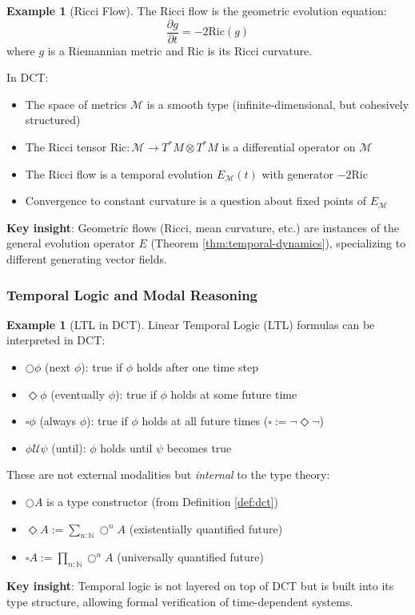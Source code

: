 \documentclass[11pt]{article}
\theoremstyle{definition}
\newtheorem{example}[theorem]{Example}
\begin{document}
\begin{example}[Ricci Flow]
The Ricci flow is the geometric evolution equation:
\[
\frac{\partial g}{\partial t} = -2 \text{Ric}(g)
\]
where $g$ is a Riemannian metric and $\text{Ric}$ is its Ricci curvature.

In DCT:
\begin{itemize}
\item The space of metrics $\mathcal{M}$ is a smooth type (infinite-dimensional, but cohesively structured)
\item The Ricci tensor $\text{Ric} : \mathcal{M} \to T^*M \otimes T^*M$ is a differential operator on $\mathcal{M}$
\item The Ricci flow is a temporal evolution $E_{\mathcal{M}}(t)$ with generator $-2\text{Ric}$
\item Convergence to constant curvature is a question about fixed points of $E_{\mathcal{M}}$
\end{itemize}

\textbf{Key insight}: Geometric flows (Ricci, mean curvature, etc.) are instances of the general evolution operator $E$ (Theorem \ref{thm:temporal-dynamics}), specializing to different generating vector fields.
\end{example}

\subsubsection{Temporal Logic and Modal Reasoning}

\begin{example}[LTL in DCT]
Linear Temporal Logic (LTL) formulas can be interpreted in DCT:

\begin{itemize}
\item $\bigcirc \phi$ (next $\phi$): true if $\phi$ holds after one time step
\item $\Diamond \phi$ (eventually $\phi$): true if $\phi$ holds at some future time
\item $\square \phi$ (always $\phi$): true if $\phi$ holds at all future times ($\square := \neg \Diamond \neg$)
\item $\phi \mathcal{U} \psi$ (until): $\phi$ holds until $\psi$ becomes true
\end{itemize}

These are not external modalities but \emph{internal} to the type theory:
\begin{itemize}
\item $\bigcirc A$ is a type constructor (from Definition \ref{def:dct})
\item $\Diamond A := \sum_{n:\mathbb{N}} \bigcirc^n A$ (existentially quantified future)
\item $\square A := \prod_{n:\mathbb{N}} \bigcirc^n A$ (universally quantified future)
\end{itemize}

\textbf{Key insight}: Temporal logic is not layered on top of DCT but is built into its type structure, allowing formal verification of time-dependent systems.
\end{example}
\end{document}
